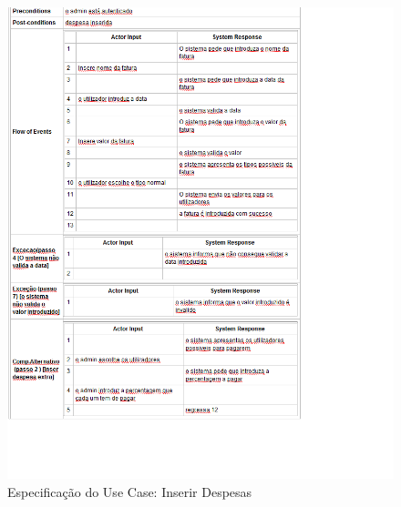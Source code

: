\begin{figure}[htb!]
	\centering
	\includegraphics[scale=0.8]{imagens/Especificacoes/inserirdespesas}  
	\caption{Especificação do Use Case: Inserir Despesas}  
\end{figure}


